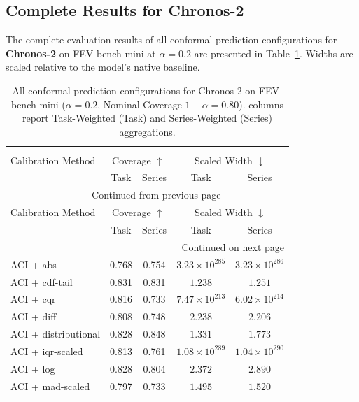 
\subsection{Complete Results for Chronos-2}
The complete evaluation results of all conformal prediction configurations for \textbf{Chronos-2} on FEV-bench mini at $\alpha=0.2$ are presented in Table~\ref{tab:all_results_chronos2}. Widths are scaled relative to the model's native baseline.

\begin{longtable}{lcccc}
	\caption{All conformal prediction configurations for Chronos-2 on FEV-bench mini ($\alpha=0.2$, Nominal Coverage $1-\alpha=0.80$). columns report Task-Weighted (Task) and Series-Weighted (Series) aggregations.}\\
	\label{tab:all_results_chronos2}\\
	\hline
	Calibration Method & \multicolumn{2}{c}{Coverage $\uparrow$} & \multicolumn{2}{c}{Scaled Width $\downarrow$} \\
 & Task & Series & Task & Series \\
	\hline
	\endfirsthead
	\multicolumn{5}{c}{\tablename\ \thetable\ -- Continued from previous page} \\
	\hline
	Calibration Method & \multicolumn{2}{c}{Coverage $\uparrow$} & \multicolumn{2}{c}{Scaled Width $\downarrow$} \\
 & Task & Series & Task & Series \\
	\hline
	\endhead
	\hline \multicolumn{5}{r}{{Continued on next page}} \\
	\endfoot
	\hline
	\endlastfoot
	ACI + abs & 0.768 & 0.754 & $3.23 \times 10^{285}$ & $3.23 \times 10^{286}$ \\
	ACI + cdf-tail & 0.831 & 0.831 & $1.238$ & $1.251$ \\
	ACI + cqr & 0.816 & 0.733 & $7.47 \times 10^{213}$ & $6.02 \times 10^{214}$ \\
	ACI + diff & 0.808 & 0.748 & $2.238$ & $2.206$ \\
	ACI + distributional & 0.828 & 0.848 & $1.331$ & $1.773$ \\
	ACI + iqr-scaled & 0.813 & 0.761 & $1.08 \times 10^{289}$ & $1.04 \times 10^{290}$ \\
	ACI + log & 0.828 & 0.804 & $2.372$ & $2.890$ \\
	ACI + mad-scaled & 0.797 & 0.733 & $1.495$ & $1.520$ \\

\end{longtable}
